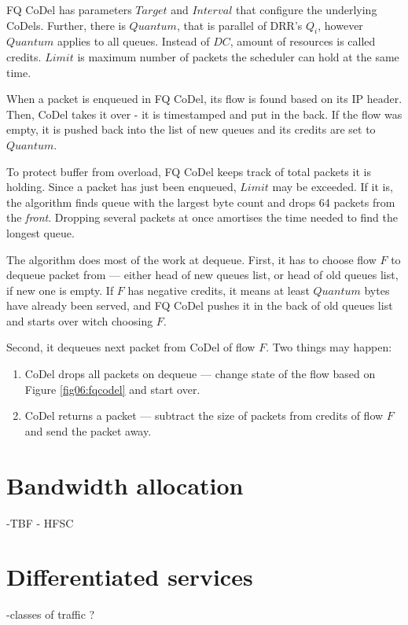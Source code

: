 FQ CoDel has parameters $Target$ and $Interval$ that configure the underlying CoDels. Further, there is $Quantum$, that is parallel of DRR's $Q_i$, however $Quantum$ applies to all queues. Instead of $DC$, amount of resources is called credits. $Limit$ is maximum number of packets the scheduler can hold at the same time.

When a packet is enqueued in FQ CoDel, its flow is found based on its IP header. Then, CoDel takes it over - it is timestamped and put in the back. If the flow was empty, it is pushed back into the list of new queues and its credits are set to $Quantum$.

To protect buffer from overload, FQ CoDel keeps track of total packets it is holding. Since a packet has just been enqueued, $Limit$ may be exceeded. If it is, the algorithm finds queue with the largest byte count and drops 64 packets from the \textit{front}. Dropping several packets at once amortises the time needed to find the longest queue.

The algorithm does most of the work at dequeue. First, it has to choose flow $F$ to dequeue packet from --- either head of new queues list, or head of old queues list, if new one is empty. If $F$ has negative credits, it means at least $Quantum$ bytes have already been served, and FQ CoDel pushes it in the back of old queues list and starts over witch choosing $F$.

Second, it dequeues next packet from CoDel of flow $F$. Two things may happen:
\begin{enumerate}
	\item CoDel drops all packets on dequeue --- change state of the flow based on Figure \ref{fig06:fqcodel} and start over.
	\item CoDel returns a packet --- subtract the size of packets from credits of flow $F$ and send the packet away.
\end{enumerate}

\section{Bandwidth allocation}

-TBF - HFSC

\section{Differentiated services}
-classes of traffic
?

